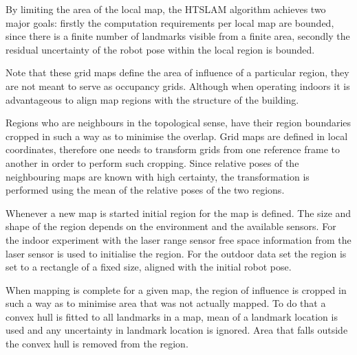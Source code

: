 By limiting the area of the local map, the HTSLAM algorithm achieves
two major goals: firstly the computation requirements per local map
are bounded, since there is a finite number of landmarks visible from
a finite area, secondly the residual uncertainty of the robot pose
within the local region is bounded.

Note that these grid maps define the area of influence of a particular
region, they are not meant to serve as occupancy grids. Although when
operating indoors it is advantageous to align map regions with the
structure of the building.

Regions who are neighbours in the topological sense, have their region
boundaries cropped in such a way as to minimise the overlap. Grid maps
are defined in local coordinates, therefore one needs to transform
grids from one reference frame to another in order to perform such
cropping. Since relative poses of the neighbouring maps are known with
high certainty, the transformation is performed using the mean of the
relative poses of the two regions.


Whenever a new map is started initial region for the map is defined.
The size and shape of the region depends on the environment and the
available sensors. For the indoor experiment with the laser range
sensor free space information from the laser sensor is used to
initialise the region. For the outdoor data set the region is set to a
rectangle of a fixed size, aligned with the initial robot pose.

When mapping is complete for a given map, the region of influence is
cropped in such a way as to minimise area that was not actually
mapped. To do that a convex hull is fitted to all landmarks in a map,
mean of a landmark location is used and any uncertainty in landmark
location is ignored. Area that falls outside the convex hull is
removed from the region.



